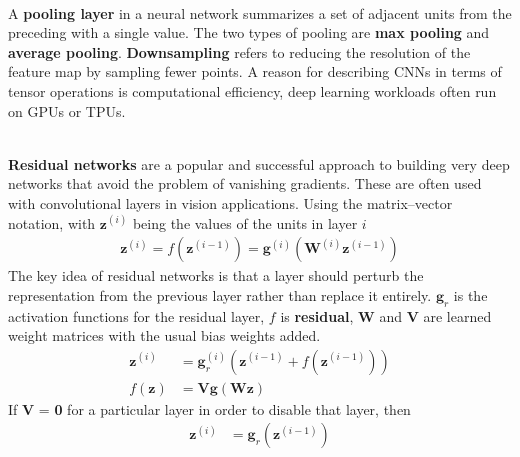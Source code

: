 \documentclass{article}
\begin{document}
\begin{paragraph}
\\
A \textbf{pooling layer} in a neural network summarizes a set of adjacent units from the preceding with a single value. The two types of pooling are \textbf{max pooling} and \textbf{average pooling}. \textbf{Downsampling} refers to reducing the resolution of the feature map by sampling fewer points. A reason for describing CNNs in terms of tensor operations is computational efficiency, deep learning workloads often run on GPUs or TPUs.
\end{paragraph}
\begin{paragraph}
\\
\textbf{Residual networks} are a popular and successful approach to building very deep networks that avoid the problem of vanishing gradients. These are often used with convolutional layers in vision applications. Using the matrix–vector notation, with $\textbf{z}^{(i)}$ being the values of the units in layer $i$
\begin{align*}
    \textbf{z}^{(i)} = f(\textbf{z}^{(i-1)}) = \textbf{g}^{(i)}(\textbf{W}^{(i)}\textbf{z}^{(i-1)})
\end{align*}
The key idea of residual networks is that a layer should perturb the representation from the previous layer rather than replace it entirely. $\textbf{g}_r$ is the activation functions for the residual layer, $f$ is \textbf{residual}, \textbf{W} and \textbf{V} are learned weight matrices with the usual bias weights added.
\begin{align*}
    \textbf{z}^{(i)} & = \textbf{g}_r^{(i)}(\textbf{z}^{(i-1)}+f(\textbf{z}^{(i-1)})) \\
    f(\textbf{z}) & = \textbf{Vg}(\textbf{Wz})
\end{align*}
If \textbf{V} = \textbf{0} for a particular layer in order to disable that layer, then
\begin{align*}
    \textbf{z}^{(i)} & = \textbf{g}_r(\textbf{z}^{(i-1)})
\end{align*}
\end{paragraph}
\end{document}
